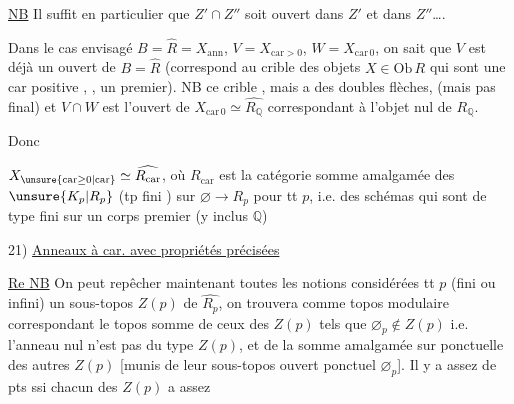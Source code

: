 \uline{NB} Il suffit en particulier que $Z'\cap Z''$ soit ouvert dans $Z'$ et dans $Z''$\ldots.

Dans le cas envisagé $B=\widehat R=X_{\mathrm{ann}}$, $V=X_{\mathrm{car}>0}$, $W=X_{\mathrm{car}\,0}$, on sait que $V$ est déjà un ouvert de $B=\widehat R$ (correspond au crible des objets $X\in\mathrm{Ob}\,R$ qui sont une car positive  , , un premier). NB ce crible  ,  mais a des doubles flèches, (mais pas  final) et $V\cap W$ est l'ouvert de $X_{\mathrm{car}\,0}\simeq\widehat{R_{\mathbb Q}}$ correspondant à  l'objet nul  de $R_{\mathbb Q}$.

Donc 



$X_{\unsure{\mathrm{car}{\geq}0|\mathrm{car}}}\simeq\widehat{R_{\mathrm{car}}}$, où $R_{\mathrm{car}}$ est la catégorie somme amalgamée des $\unsure{K_p|R_p}$ (tp fini ) sur $\varnothing\longrightarrow R_p$ pour tt $p$, i.e. des schémas  qui sont de type fini sur un corps premier (y inclus $\mathbb Q$) 

21) \uline{Anneaux à car. avec propriétés précisées}

 \uline{Re NB} On peut repêcher maintenant toutes les notions considérées   tt $p$ (fini ou infini) un sous-topos  $Z(p)$ de $\widehat{R_p}$, on trouvera comme topos modulaire correspondant le topos somme de ceux des $Z(p)$ tels que $\varnothing_p\notin Z(p)$ i.e. l'anneau nul  n'est pas  du type $Z(p)$, et de la somme amalgamée sur   ponctuelle des autres $Z(p)$ [munis de leur sous-topos ouvert ponctuel $\varnothing_p$]. Il y a assez de pts ssi chacun des $Z(p)$  a assez

